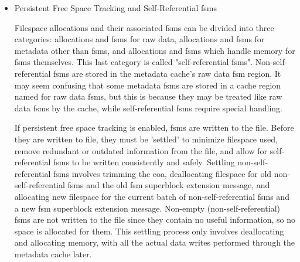 \begin{itemize}
For a file with a contiguous address space, the default behavior is to use two small \Glspl{fsm} (one for raw data and one for metadata) and one large \Gls{fsm} (for all large allocations, regardless of whether they are raw data or metadata). For a file with non-contiguous address space, it is possible to have up to 6 small \Glspl{fsm} and 6 large \Glspl{fsm}. These correspond to the six file space types: raw data and five types of metadata.

    \item Persistent Free Space Tracking and Self-Referential \glspl{fsm}

Filespace allocations and their associated \Glspl{fsm} can be divided into three categories: allocations and \Glspl{fsm} for raw data, allocations and \Glspl{fsm} for metadata other than \Glspl{fsm}, and allocations and \Glspl{fsm} which handle memory for \Glspl{fsm} themselves. This last category is called "self-referential \Glspl{fsm}". Non-self-referential \Glspl{fsm} are stored in the metadata cache's raw data \Gls{fsm} region. It may seem confusing that some metadata \Glspl{fsm} are stored in a cache region named for raw data \Glspl{fsm}, but this is because they may be treated like raw data \Glspl{fsm} by the cache, while self-referential \Glspl{fsm} require special handling.

If persistent free space tracking is enabled, \Glspl{fsm} are written to the file. Before they are written to file, they must be 'settled' to minimize filespace used, remove redundant or outdated information from the file, and allow for self-referential \Glspl{fsm} to be written consistently and safely. Settling non-self-referential \Glspl{fsm} involves trimming the \gls{eoa}, deallocating filespace for old non-self-referential \Glspl{fsm} and the old \Gls{fsm} superblock extension message, and allocating new filespace for the current batch of non-self-referential \Glspl{fsm} and a new \Gls{fsm} superblock extension message. Non-empty (non-self-referential) \Glspl{fsm} are not written to the file since they contain no useful information, so no space is allocated for them. This settling process only involves deallocating and allocating memory, with all the actual data writes performed through the metadata cache later.


\end{itemize}

